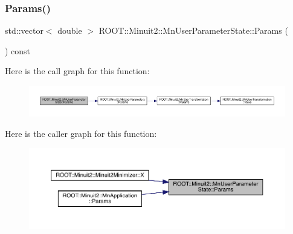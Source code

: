 \mbox{\label{classROOT_1_1Minuit2_1_1MnUserParameterState_af9ed845d2a223223497414296477889f}} 
\subsubsection{\texorpdfstring{Params()}{Params()}\hspace{0.1cm}{\footnotesize\ttfamily [2/2]}}
{\footnotesize\ttfamily std\+::vector$<$ double $>$ R\+O\+O\+T\+::\+Minuit2\+::\+Mn\+User\+Parameter\+State\+::\+Params (\begin{DoxyParamCaption}{ }\end{DoxyParamCaption}) const}

Here is the call graph for this function\+:\nopagebreak
\begin{figure}[H]
\begin{center}
\leavevmode
\includegraphics[width=350pt]{d3/de0/classROOT_1_1Minuit2_1_1MnUserParameterState_af9ed845d2a223223497414296477889f_cgraph}
\end{center}
\end{figure}
Here is the caller graph for this function\+:\nopagebreak
\begin{figure}[H]
\begin{center}
\leavevmode
\includegraphics[width=350pt]{d3/de0/classROOT_1_1Minuit2_1_1MnUserParameterState_af9ed845d2a223223497414296477889f_icgraph}
\end{center}
\end{figure}
\mbox{\label{classROOT_1_1Minuit2_1_1MnUserParameterState_a03f90db04e5573afaef3865d0d87b85b}} 
